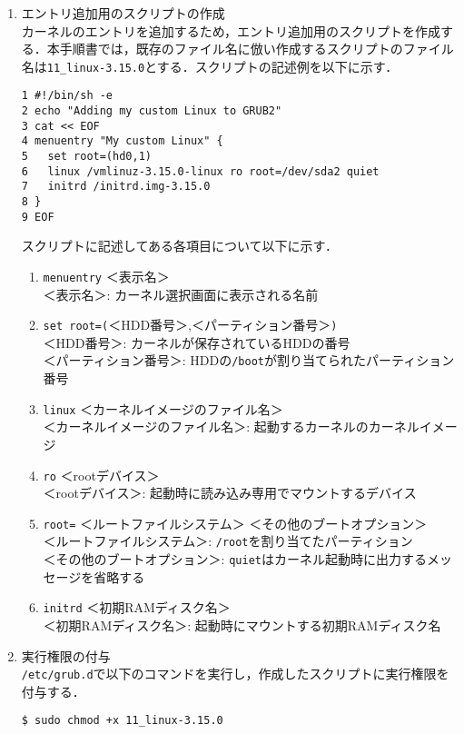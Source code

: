 \documentclass[12pt]{jsarticle}
\begin{document}
\begin{enumerate}
  \begin{enumerate}
  \item エントリ追加用のスクリプトの作成\\
    カーネルのエントリを追加するため，エントリ追加用のスクリプトを作成する．本手順書では，既存のファイル名に倣い作成するスクリプトのファイル名は\verb|11_linux-3.15.0|とする．スクリプトの記述例を以下に示す．
\begin{verbatim}
1 #!/bin/sh -e
2 echo "Adding my custom Linux to GRUB2"
3 cat << EOF
4 menuentry "My custom Linux" {
5   set root=(hd0,1)
6   linux /vmlinuz-3.15.0-linux ro root=/dev/sda2 quiet
7   initrd /initrd.img-3.15.0
8 }
9 EOF
\end{verbatim}

\newpage
スクリプトに記述してある各項目について以下に示す．
    \begin{enumerate}
    \item \verb|menuentry| ＜表示名＞ \\
      ＜表示名＞: カーネル選択画面に表示される名前
    \item \verb|set root=(|＜HDD番号＞,＜パーティション番号＞\verb|)| \\
      ＜HDD番号＞: カーネルが保存されているHDDの番号 \\
      ＜パーティション番号＞: HDDの\verb|/boot|が割り当てられたパーティション番号
    \item \verb|linux| ＜カーネルイメージのファイル名＞ \\
      ＜カーネルイメージのファイル名＞: 起動するカーネルのカーネルイメージ
    \item \verb|ro| ＜rootデバイス＞\\
      ＜rootデバイス＞: 起動時に読み込み専用でマウントするデバイス
    \item \verb|root=| ＜ルートファイルシステム＞ ＜その他のブートオプション＞\\
      ＜ルートファイルシステム＞: \verb|/root|を割り当てたパーティション \\
      ＜その他のブートオプション＞: \verb|quiet|はカーネル起動時に出力するメッセージを省略する
    \item \verb|initrd| ＜初期RAMディスク名＞ \\
      ＜初期RAMディスク名＞: 起動時にマウントする初期RAMディスク名
    \end{enumerate}
    
  \item 実行権限の付与\\
    \verb|/etc/grub.d|で以下のコマンドを実行し，作成したスクリプトに実行権限を付与する．
\begin{verbatim}
$ sudo chmod +x 11_linux-3.15.0
\end{verbatim}


\end{enumerate}
\end{enumerate}
\end{document}
